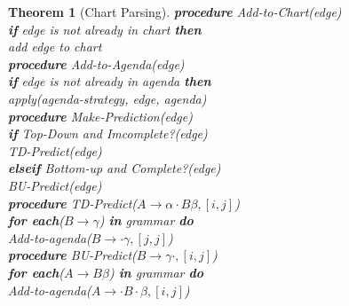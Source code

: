 \documentclass[12pt]{article}
\newcommand{\ind}{\hspace*{15pt}}
\newtheorem{theorem}{Theorem}[section]
\theoremstyle{definition}
\begin{document}
\begin{theorem}[Chart Parsing]
\textbf{procedure} Add-to-Chart(edge)\\
\textbf{if} edge is not already in chart \textbf{then}\\
\ind add edge to chart\\

\textbf{procedure} Add-to-Agenda(edge)\\
\textbf{if} edge is not already in agenda \textbf{then}\\
\ind apply(agenda-strategy, edge, agenda)\\

\textbf{procedure} Make-Prediction(edge)\\
\textbf{if} Top-Down and Imcomplete?(edge)\\
\ind TD-Predict(edge)\\
\textbf{elseif} Bottom-up and Complete?(edge)\\
\ind BU-Predict(edge)\\

\textbf{procedure} TD-Predict($A\to \alpha\cdot B \beta, [i,j]$)\\
\textbf{for each}($B\to\gamma$) \textbf{in} grammar \textbf{do}\\
\ind Add-to-agenda($B\to\cdot \gamma, [j,j]$)\\

\textbf{procedure} BU-Predict($B\to \gamma\cdot, [i,j]$)\\
\textbf{for each}($A\to B\beta$) \textbf{in} grammar \textbf{do}\\
\ind Add-to-agenda($A\to\cdot B\cdot \beta, [i,j]$)\\
\end{theorem}
\clearpage
\end{document}
